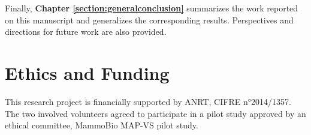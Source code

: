 Finally, \textbf{Chapter \ref{section:generalconclusion}} summarizes the work reported on this manuscript and generalizes the corresponding results. Perspectives and directions for future work are also provided.  

\cleardoublepage  

\chapter*{Ethics and Funding}\label{section:ethics}

This research project is financially supported by ANRT, CIFRE n°2014/1357.
\\

\noindent
The two involved volunteers agreed to participate in a pilot study approved by an ethical committee, MammoBio MAP-VS pilot study.

\cleardoublepage
